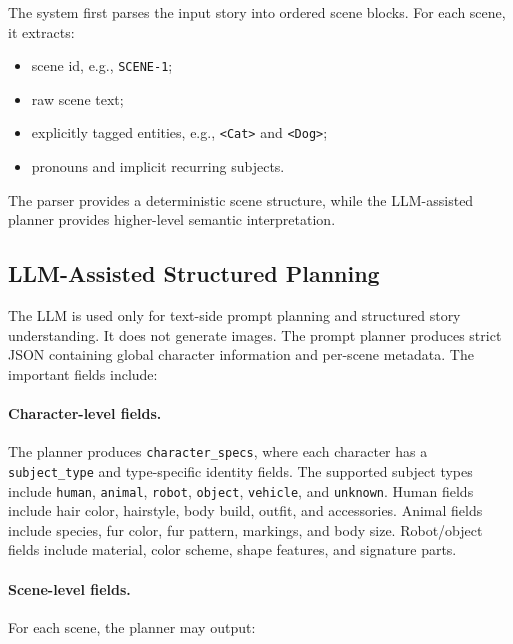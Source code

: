 \documentclass[11pt,a4paper]{article}
\begin{document}
The system first parses the input story into ordered scene blocks. For each scene, it extracts:

\begin{itemize}[leftmargin=*]
    \item scene id, e.g., \texttt{SCENE-1};
    \item raw scene text;
    \item explicitly tagged entities, e.g., \texttt{<Cat>} and \texttt{<Dog>};
    \item pronouns and implicit recurring subjects.
\end{itemize}

The parser provides a deterministic scene structure, while the LLM-assisted planner provides higher-level semantic interpretation.

\subsection{LLM-Assisted Structured Planning}

The LLM is used only for text-side prompt planning and structured story understanding. It does not generate images. The prompt planner produces strict JSON containing global character information and per-scene metadata. The important fields include:

\paragraph{Character-level fields.}
The planner produces \texttt{character\_specs}, where each character has a \texttt{subject\_type} and type-specific identity fields. The supported subject types include \texttt{human}, \texttt{animal}, \texttt{robot}, \texttt{object}, \texttt{vehicle}, and \texttt{unknown}. Human fields include hair color, hairstyle, body build, outfit, and accessories. Animal fields include species, fur color, fur pattern, markings, and body size. Robot/object fields include material, color scheme, shape features, and signature parts.

\paragraph{Scene-level fields.}
For each scene, the planner may output:
\end{document}
